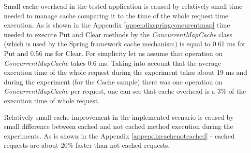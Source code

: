 \documentclass[10pt,a4paper]{article}
\begin{document}
Small cache overhead in the tested application is caused by relatively small time needed to manage cache comparing it to the time of the whole request time execution. As is shown in the Appendix \ref{appendixspringconcurentmap} time needed to execute Put and Clear methods by the \textit{ConcurrentMapCache} class (which is used by the Spring framework cache mechanism) is equal to 0.61 ms for Put and 0.56 ms for Clear. For simplicity let us assume that operation on \textit{ConcurrentMapCache} takes 0.6 ms. Taking into account that the average execution time of the whole request during the experiment takes about 19 ms and during the experiment (for the Cache sample) there was one operation on \textit{ConcurrentMapCache} per request, one can see that cache overhead is a 3\% of the execution time of whole request.  

Relatively small cache improvement in the implemented scenario is caused by small difference between cached and not cached method execution during the experiments. As is shown in the Appendix \ref{appendixcachenotcached} - cached requests are about 20\% faster than not cached requests. 
\end{document}
